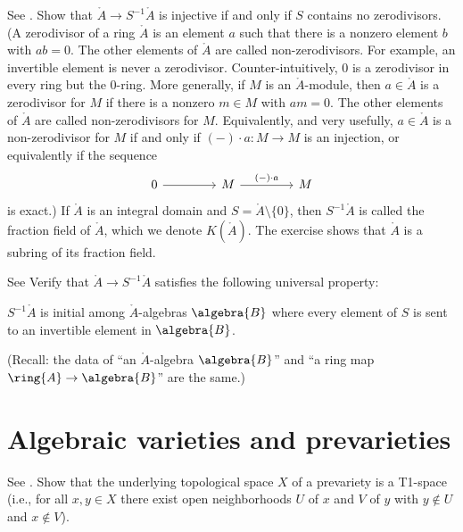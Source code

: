 \begin{exercise}
  See \cite[Exercise 1.3.C]{vakil2024the-rising-sea}.
  Show that $\ring{A}\rightarrow S^{-1}\ring{A}$ is injective if and only if $S$ contains no
  zerodivisors. (A zerodivisor of a ring $\ring{A}$ is an element $a$ such that
  there is a nonzero element $b$ with $ab = 0$. The other elements of $\ring{A}$
  are called non-zerodivisors. For example, an invertible element is
  never a zerodivisor. Counter-intuitively, $0$ is a zerodivisor in
  every ring but the $0$-ring. More generally, if $M$ is an $\ring{A}$-module, then
  $a\in \ring{A}$ is a zerodivisor for $M$ if there is a nonzero $m \in M$ with $am =
  0$. The other elements of $\ring{A}$ are called non-zerodivisors for
  $M$. Equivalently, and very usefully, $a\in \ring{A}$ is a non-zerodivisor for $M$
  if and only if $(-)\cdot a \colon M\rightarrow  M$ is an injection,
  or equivalently if the sequence
    \begin{equation}
      \begin{tikzcd}[nodes in empty cells, column sep= 1.5cm, row sep=1.5cm]
        0 \ar[r] & M \ar[r, "(-)\cdot a "] & M 
      \end{tikzcd}
    \end{equation}
  is exact.) If $\ring{A}$ is an integral
  domain and $S = \ring{A}\setminus \{0\}$, then $S^{-1}\ring{A}$ is called the fraction field of $\ring{A}$,
  which we denote $K(\ring{A})$. The exercise shows that $\ring{A}$ is
  a subring of its fraction field.
\end{exercise}

\begin{exercise}
  See \cite[Exercise 1.3.D.]{vakil2024the-rising-sea}
  Verify that $\ring{A}\rightarrow S^{-1}\ring{A}$ satisfies the
  following universal property:

  $S^{-1}\ring{A}$ is initial among $\ring{A}$-algebras $\algebra{B}$
  where every element of $S$ is sent to an invertible element in
  $\algebra{B}$.

  (Recall: the data of “an $\ring{A}$-algebra $\algebra{B}$” and “a
  ring map $\ring{A}\rightarrow \algebra{B}$” are the same.)
\end{exercise}


\section{Algebraic varieties and prevarieties}

\begin{exercise}
  See \cite[Exercise 1.4]{görtz2010algebraic}.
  Show that the underlying topological space $X$ of a prevariety is a
  T1-space (i.e., for all $x, y \in X$ there exist open neighborhoods
  $U$ of $x$ and $V$ of $y$ with $y\notin U$ and $x\notin V$).
\end{exercise}

